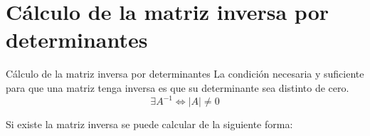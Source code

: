 \documentclass[9pt,aspectratio=159]{beamer}
\begin{document}
\begin{frame}
\end{frame}

\section{Cálculo de la matriz inversa por determinantes}

\begin{frame}{Cálculo de la matriz inversa por determinantes}
La condición necesaria y suficiente para que una matriz tenga inversa es que su determinante sea distinto de cero.
\[ \exists A^{-1} \Leftrightarrow |A| \neq 0 \]

\pause

Si existe la matriz inversa se puede calcular de la siguiente forma:

\begin{center}
\end{center}

\end{frame}
\end{document}
